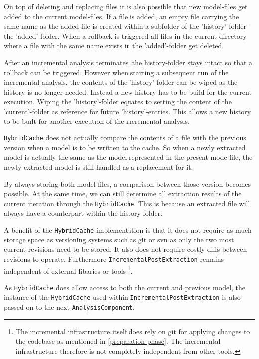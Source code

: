 \documentclass[a4paper]{article}
\begin{document}
 On top of deleting and replacing files it is also possible that new model-files get added to the current model-files. If a file is added, an empty file carrying the same name as the added file is created within a subfolder of the 'history'-folder - the 'added'-folder. When a rollback is triggered all files in the current directory where a file with the same name exists in the 'added'-folder get deleted.
 
After an incremental analysis terminates, the history-folder stays intact so that a rollback can be triggered. 
However when starting a subsequent run of the incremental analysis, the contents of the 'history'-folder can be wiped as the history is no longer needed. Instead a new history has to be build for the current execution. Wiping the 'history'-folder equates to setting the content of the 'current'-folder as reference for future 'history'-entries. This allows a new history to be built for another execution of the incremental analysis.
  
 \texttt{HybridCache} does not actually compare the contents of a file with the previous version when a model is to be written to the cache. So when a newly extracted model is actually the same as the model represented in the present mode-file, the newly extracted model is still handled as a replacement for it. 
  
 By always storing both model-files, a comparison between those version becomes possible. At the same time, we can still determine all extraction results of the current iteration through the \texttt{HybridCache}. This is because an extracted file will always have a counterpart within the history-folder.
   
 A benefit of the \texttt{HybridCache} implementation is that it does not require as much storage space as versioning systems such as git or svn as only the two most current revisions need to be stored. It also does not require costly diffs between revisions to operate. Furthermore \texttt{IncrementalPostExtraction} remains independent of external libaries or tools \footnote{The incremental infrastructure itself does rely on git for applying changes to the codebase as mentioned in \autoref{preparation-phase}. The incremental infrastructure therefore is not completely independent from other tools.}.
 
As \texttt{HybridCache} does allow access to both the current and previous model, the instance of the \texttt{HybridCache} used within \texttt{IncrementalPostExtraction} is also passed on to the next \texttt{AnalysisComponent}. 
  
\end{document}
